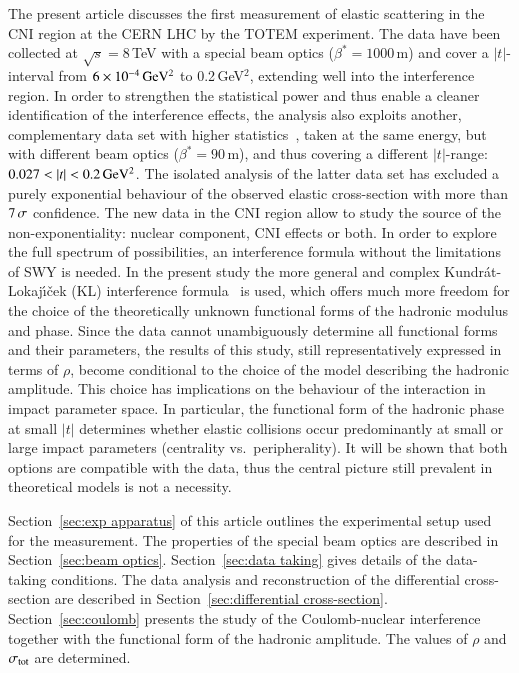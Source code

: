 The present article discusses the first measurement of elastic scattering in the CNI region at the CERN LHC by the TOTEM experiment. The data have been collected at $\sqrt{s} = 8\,$TeV with a special beam optics ($\beta^{*}=1000\,$m) and cover a $|t|$-interval from $6\times10^{-4}\,\rm GeV^{2}$ to 0.2\,GeV$^{2}$, extending well into the interference region. In order to strengthen the statistical power and thus enable a cleaner identification of the interference effects, the analysis also exploits another, complementary data set with higher statistics~\cite{8tev-90m}, taken at the same energy, but with different beam optics ($\beta^{*}=90\,$m), and thus covering a different $|t|$-range: $0.027 < |t| < 0.2\,{\rm GeV^2}$. The isolated analysis of the latter data set has excluded a purely exponential behaviour of the observed elastic cross-section with more than $7\,{\rm \sigma}$ confidence. The new data in the CNI region allow to study the source of the non-exponentiality: nuclear component, CNI effects or both. In order to explore the full spectrum of possibilities, an interference formula without the limitations of SWY is needed. In the present study the more general and complex Kundr\'{a}t-Lokaj\'{\i}\v{c}ek (KL) interference formula~\cite{kl94} is used, which offers much more freedom for the choice of the theoretically unknown functional forms of the hadronic modulus and phase. Since the data cannot unambiguously determine all functional forms and their parameters, the results of this study, still representatively expressed in terms of $\rho$, become conditional to the choice of the model describing the hadronic amplitude. This choice has implications on the behaviour of the interaction in impact parameter space. In particular, the functional form of the hadronic phase at small $|t|$ determines whether elastic collisions occur predominantly at small or large impact parameters (centrality vs.~peripherality). It will be shown that both options are compatible with the data, thus the central picture still prevalent in theoretical models is not a necessity.

Section~\ref{sec:exp apparatus} of this article outlines the experimental setup used for the measurement. The properties of the special beam optics are described in Section~\ref{sec:beam optics}. Section~\ref{sec:data taking} gives details of the data-taking conditions. The data analysis and reconstruction of the differential cross-section are described in Section~\ref{sec:differential cross-section}. Section~\ref{sec:coulomb} presents the study of the Coulomb-nuclear interference together with the functional form of the hadronic amplitude. The values of $\rho$ and $\sigma_{\rm tot}$ are determined.
